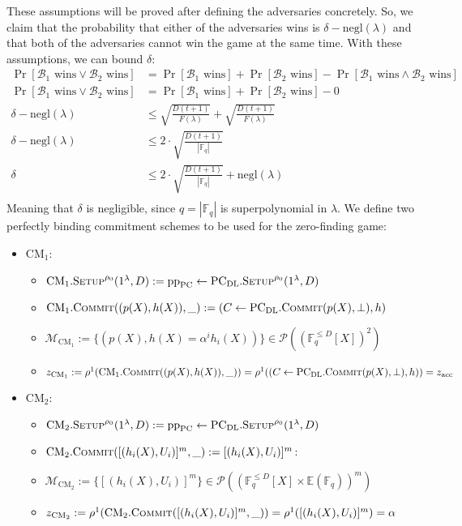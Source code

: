 \documentclass[
]{article}
\providecommand{\tightlist}{%
  \setlength{\itemsep}{0pt}\setlength{\parskip}{0pt}}
\newcommand*\Fb{\mathbb{F}}
\newcommand*\Eb{\mathbb{E}}
\newcommand*\Bc{\mathcal{B}}
\newcommand*\Mc{\mathcal{M}}
\newcommand*\Pc{\mathcal{P}}
\renewcommand*\a{\alpha}
\renewcommand*\d{\delta}
\renewcommand*\l{\lambda}
\newcommand*{\negl}{\text{negl}}
\newcommand*{\from}{\gets}
\newcommand*{\pp}{\mathrm{pp}}
\newcommand*{\acc}{\mathrm{acc}}
\newcommand*{\Setup}{\mathrm{\text{S{\scriptsize ETUP}}}}
\newcommand*{\Commit}{\mathrm{\text{C{\scriptsize OMMIT}}}}
\newcommand*{\PC}{\text{PC}}
\newcommand*{\PCDL}{\text{PC}_{\text{DL}}}
\newcommand*{\PCDLSetup}{\PCDL.\Setup}
\newcommand*{\PCDLCommit}{\PCDL.\Commit}
\newcommand*{\CM}{\mathrm{\text{CM}}}
\begin{document}
These assumptions will be proved after defining the adversaries
concretely. So, we claim that the probability that either of the
adversaries wins is \(\delta -
\negl(\l)\) and that both of the adversaries cannot win the game at the
same time. With these assumptions, we can bound \(\d\): \[
\begin{aligned}
  \Pr[\Bc_1 \text{ wins} \lor \Bc_2 \text{ wins}] &= \Pr[\Bc_1 \text{ wins}] + \Pr[\Bc_2\text{ wins}] - \Pr[\Bc_1 \text{ wins} \land \Bc_2 \text{ wins}]\\
  \Pr[\Bc_1 \text{ wins} \lor \Bc_2 \text{ wins}] &= \Pr[\Bc_1 \text{ wins}] + \Pr[\Bc_2\text{ wins}] - 0 \\
  \delta - \negl(\l)                              &\leq  \sqrt{\frac{D(t+1)}{F(\l)}} + \sqrt{\frac{D(t+1)}{F(\l)}} \\
  \delta - \negl(\l)                              &\leq  2 \cdot \sqrt{\frac{D(t+1)}{|\Fb_q|}}                     \\
  \delta                                          &\leq  2 \cdot \sqrt{\frac{D(t+1)}{|\Fb_q|}} + \negl(\l)         \\
\end{aligned}
\] Meaning that \(\delta\) is negligible, since \(q = |\Fb_q|\) is
superpolynomial in \(\l\). We define two perfectly binding commitment
schemes to be used for the zero-finding game:

\begin{itemize}
\tightlist
\item
  \(\CM_1\):

  \begin{itemize}
  \tightlist
  \item
    \(\CM_1.\Setup^{\rho_0}(1^\l, D) := \pp_\PC \from \PCDLSetup^{\rho_0}(1^\lambda, D)\)
  \item
    \(\CM_1.\Commit((p(X), h(X)), \_) := (C \from \PCDLCommit(p(X), \bot), h)\)
  \item
    \(\Mc_{\CM_1} := \{(p(X), h(X) = \a^i h_i(X))\} \in \Pc((\Fb_q^{\leq D}[X])^2)\)
  \item
    \(z_{\CM_1} := \rho^1(\CM_1.\Commit((p(X), h(X)), \_)) = \rho^1((C \from \PCDLCommit(p(X), \bot), h)) = z_\acc\)
  \end{itemize}
\item
  \(\CM_2\):

  \begin{itemize}
  \tightlist
  \item
    \(\CM_2.\Setup^{\rho_0}(1^\l, D) := \pp_\PC \from \PCDLSetup^{\rho_0}(1^\lambda, D)\)
  \item
    \(\CM_2.\Commit([(h_i(X), U_i)]^m, \_) := [(h_i(X), U_i)]^m\):
  \item
    \(\Mc_{\CM_2} := \{[(h_i(X), U_i)]^m\} \in \Pc((\Fb_q^{\leq D}[X] \times \Eb(\Fb_q))^m)\)
  \item
    \(z_{\CM_2} := \rho^1(\CM_2.\Commit([(h_i(X), U_i)]^m, \_)) = \rho^1([(h_i(X), U_i)]^m) = \a\)
  \end{itemize}
\end{itemize}
\end{document}
